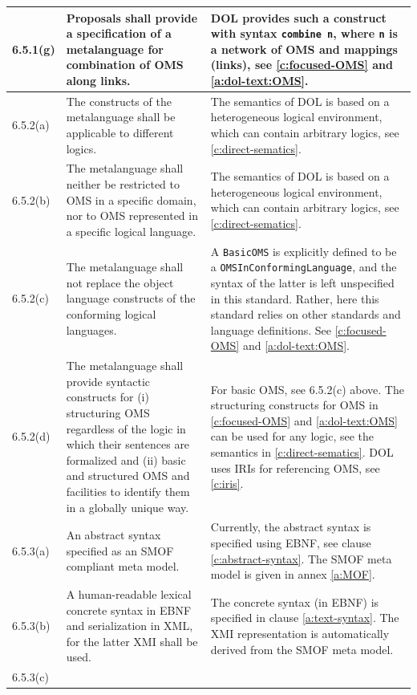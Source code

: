 \documentclass[10pt,fleqn,%
\ifpretendfinal
final%
\else
draft%
\fi,
]{scrreprt}
\newcommand*{\syntax}[1]{\texttt{#1}}
\begin{document}
\begin{center}
\begin{longtable}{|p{}|p{}|p{}|}
	\\ \hline
%
6.5.1(g) & 
Proposals shall provide a specification of a metalanguage for combination of OMS along links. 	&
DOL provides such a construct with syntax \syntax{combine n}, where \syntax{n} is a network of OMS and mappings (links),  see \ref{c:focused-OMS} and \ref{a:dol-text:OMS}.
	\\ \hline
%
6.5.2(a)& 
The constructs of the metalanguage shall be applicable to different logics.	&
The semantics of DOL is based on a heterogeneous logical
environment, which can contain arbitrary logics, see \ref{c:direct-sematics}.
   \\ \hline
%
6.5.2(b)& 
The metalanguage shall neither be restricted to OMS in a specific domain, nor to OMS represented
in a specific logical language.	&
The semantics of DOL is based on a heterogeneous logical
environment, which can contain arbitrary logics, see \ref{c:direct-sematics}.
   \\ \hline
%
6.5.2(c)& 
The metalanguage shall not replace the object language constructs of the conforming logical
languages.	&
A \syntax{BasicOMS} is explicitly defined to be a \syntax{OMSInConformingLanguage}, and the syntax
of the latter is left unspecified in this standard. Rather, here this standard relies on other
standards and language definitions.
See \ref{c:focused-OMS} and \ref{a:dol-text:OMS}.
   \\ \hline
%
6.5.2(d)& 
The metalanguage shall provide syntactic constructs for (i) structuring OMS regardless of the
logic in which their sentences are formalized and (ii) basic and structured OMS and facilities to
identify them in a globally unique way.
	&
For basic OMS, see 6.5.2(c) above.
The structuring constructs for OMS in \ref{c:focused-OMS} and \ref{a:dol-text:OMS} can be used for 
any logic, see the semantics in \ref{c:direct-sematics}. DOL uses IRIs for referencing OMS, see
\ref{c:iris}.
   \\ \hline
%
6.5.3(a)& 
An abstract syntax specified as an SMOF compliant meta model.	&
Currently, the abstract syntax is specified using EBNF, see clause \ref{c:abstract-syntax}. The
SMOF meta model is given in annex \ref{a:MOF}.
   \\ \hline
%
6.5.3(b)& 
A human-readable lexical concrete syntax in EBNF and serialization in XML, for the latter XMI shall
be used.	&
The concrete syntax (in EBNF) is specified in clause \ref{a:text-syntax}. The XMI representation 
is automatically derived from the SMOF meta model.
   \\ \hline
%
6.5.3(c)& 

\end{longtable}
\end{center}
\end{document}
